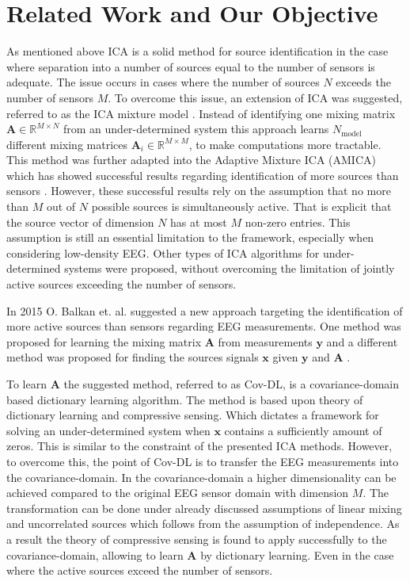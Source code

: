 \section{Related Work and Our Objective}\label{sec:relatedwork}
As mentioned above ICA is a solid method for source identification in the case where separation into a number of sources equal to the number of sensors is adequate. The issue occurs in cases where the number of sources $N$ exceeds the number of sensors $M$. 
To overcome this issue, an extension of ICA was suggested, referred to as the ICA mixture model \cite{Balkan2015}.
Instead of identifying one mixing matrix $\mathbf{A} \in \mathbb{R}^{M \times N}$ from an under-determined system this approach learns $N_{\text{model}}$ different mixing matrices $\mathbf{A}_i \in \mathbb{R}^{M\times M}$, to make computations more tractable. 
This method was further adapted into the Adaptive Mixture ICA (AMICA) which has showed successful results regarding identification of more sources than sensors \cite{Palmer2008}. 
However, these successful results rely on the assumption that no more than $M$ out of $N$ possible sources is simultaneously active. That is explicit that the source vector of dimension $N$ has at most $M$ non-zero entries.
This assumption is still an essential limitation to the framework, especially when considering low-density EEG. 
Other types of ICA algorithms for under-determined systems were proposed, without overcoming the limitation of jointly active sources exceeding the number of sensors.

In 2015 O. Balkan et. al. suggested a new approach targeting the identification of more active sources than sensors regarding EEG measurements. One method was proposed for learning the mixing matrix $\mathbf{A}$ from measurements $\mathbf{y}$ \cite{Balkan2015} and a different method was proposed for finding the sources signals $\mathbf{x}$ given $\mathbf{y}$ and $\mathbf{A}$ \cite{Balkan2014}.

To learn $\mathbf{A}$ the suggested method, referred to as Cov-DL, is a covariance-domain based dictionary learning algorithm. 
The method is based upon theory of dictionary learning and compressive sensing. Which dictates a framework for solving an under-determined system when $\mathbf{x}$ contains a sufficiently amount of zeros. 
This is similar to the constraint of the presented ICA methods. However, to overcome this, the point of Cov-DL is to transfer the EEG measurements into the covariance-domain. In the covariance-domain a higher dimensionality can be achieved compared to the original EEG sensor domain with dimension $M$.
The transformation can be done under already discussed assumptions of linear mixing and uncorrelated sources which follows from the assumption of independence.
As a result the theory of compressive sensing is found to apply successfully to the covariance-domain, allowing to learn $\mathbf{A}$ by dictionary learning. Even in the case where the active sources exceed the number of sensors.

